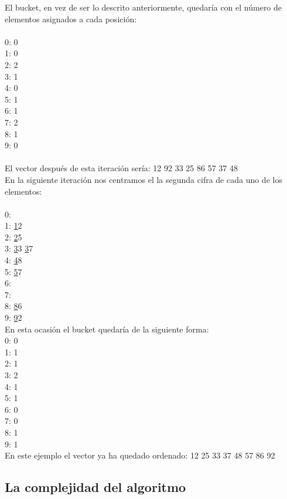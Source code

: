 El bucket, en vez de ser lo descrito anteriormente, quedaría con el número de elementos asignados a cada posición:\\
\\
0: 0\\
1: 0\\
2: 2\\
3: 1\\
4: 0\\
5: 1\\
6: 1\\
7: 2\\
8: 1\\
9: 0\\
\\

El vector después de esta iteración sería: 12 92 33 25 86 57 37 48\\
\newpage
En la siguiente iteración nos centramos el la segunda cifra de cada uno de los elementos:\\
\\
0:\\
1: \underline{1}2\\
2: \underline{2}5\\
3: \underline{3}3 \underline{3}7\\
4: \underline{4}8\\
5: \underline{5}7\\
6: \\
7: \\
8: \underline{8}6\\
9: \underline{9}2\\

En esta ocasión el bucket quedaría de la siguiente forma:
\\
0: 0\\
1: 1\\
2: 1\\
3: 2\\
4: 1\\
5: 1\\
6: 0\\
7: 0\\
8: 1\\
9: 1\\

En este ejemplo el vector ya ha quedado ordenado: 12 25 33 37 48 57 86 92\\

\newpage

\subsection{La complejidad del algoritmo}
